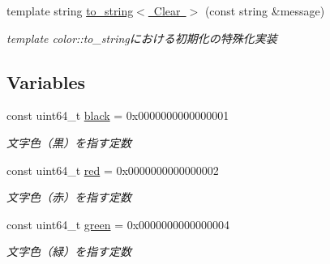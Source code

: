 \begin{DoxyCompactItemize}
\mbox{\label{namespace_g_a_1_1color_abf46f0d0a1ba3d606e41141334c44ae9}} 
template string \mbox{\hyperlink{namespace_g_a_1_1color_abf46f0d0a1ba3d606e41141334c44ae9}{to\+\_\+string$<$ Clear $>$}} (const string \&message)
\begin{DoxyCompactList}\small\item\em template color\+::to\+\_\+stringにおける初期化の特殊化実装 \end{DoxyCompactList}\end{DoxyCompactItemize}
\subsection*{Variables}
\begin{DoxyCompactItemize}
\item 
\mbox{\label{namespace_g_a_1_1color_ac8fbb254e282f69ab345c2ca4168bd48}} 
const uint64\+\_\+t \mbox{\hyperlink{namespace_g_a_1_1color_ac8fbb254e282f69ab345c2ca4168bd48}{black}} = 0x00\textquotesingle{}00\textquotesingle{}00\textquotesingle{}00\textquotesingle{}00\textquotesingle{}00\textquotesingle{}00\textquotesingle{}01
\begin{DoxyCompactList}\small\item\em 文字色（黒）を指す定数 \end{DoxyCompactList}\item 
\mbox{\label{namespace_g_a_1_1color_a89bf711b309daf3e3a35e8be3b420769}} 
const uint64\+\_\+t \mbox{\hyperlink{namespace_g_a_1_1color_a89bf711b309daf3e3a35e8be3b420769}{red}} = 0x00\textquotesingle{}00\textquotesingle{}00\textquotesingle{}00\textquotesingle{}00\textquotesingle{}00\textquotesingle{}00\textquotesingle{}02
\begin{DoxyCompactList}\small\item\em 文字色（赤）を指す定数 \end{DoxyCompactList}\item 
\mbox{\label{namespace_g_a_1_1color_a246ba6650760ddb9d47f4fd40fbf60e9}} 
const uint64\+\_\+t \mbox{\hyperlink{namespace_g_a_1_1color_a246ba6650760ddb9d47f4fd40fbf60e9}{green}} = 0x00\textquotesingle{}00\textquotesingle{}00\textquotesingle{}00\textquotesingle{}00\textquotesingle{}00\textquotesingle{}00\textquotesingle{}04
\begin{DoxyCompactList}\small\item\em 文字色（緑）を指す定数 \end{DoxyCompactList}\item 

\end{DoxyCompactItemize}
